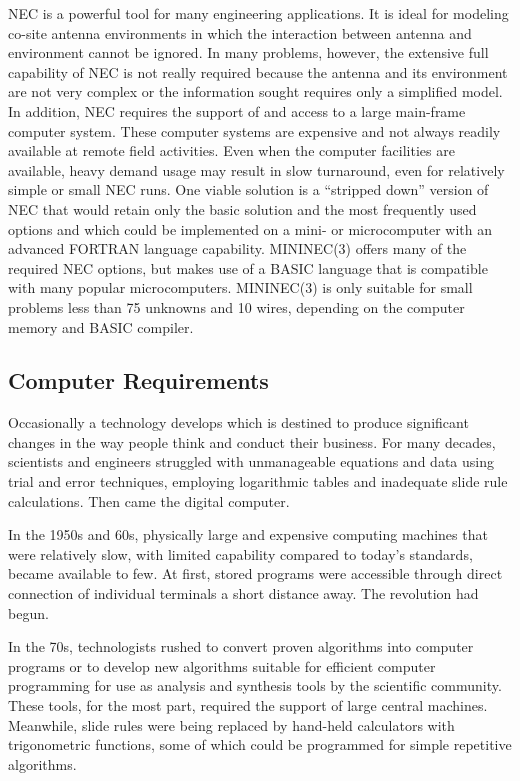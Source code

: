 \documentclass[12pt]{article}
\begin{document}
NEC is a powerful tool for many engineering applications. It is ideal
for modeling co-site antenna environments in which the interaction
between antenna and environment cannot be ignored. In many problems,
however, the extensive full capability of NEC is not really required
because the antenna and its environment are not very complex or the
information sought requires only a simplified model. In addition, NEC
requires the support of and access to a large main-frame computer
system. These computer systems are expensive and not always readily
available at remote field activities. Even when the computer facilities
are available, heavy demand usage may result in slow turnaround, even
for relatively simple or small NEC runs. One viable solution is a
``stripped down'' version of NEC that would retain only the basic
solution and the most frequently used options and which could be
implemented on a mini- or microcomputer with an advanced FORTRAN
language capability. MININEC(3) offers many of the required NEC options,
but makes use of a BASIC language that is compatible with many popular
microcomputers. MININEC(3) is only suitable for small problems less than
75 unknowns and 10 wires, depending on the computer memory and BASIC
compiler.

\subsection{Computer Requirements}
Occasionally a technology develops which is destined to produce
significant changes in the way people think and conduct their business.
For many decades, scientists and engineers struggled with unmanageable
equations and data using trial and error techniques, employing
logarithmic tables and inadequate slide rule calculations. Then came the
digital computer.

In the 1950s and 60s, physically large and expensive computing machines
that were relatively slow, with limited capability compared to today's
standards, became available to few. At first, stored programs were
accessible through direct connection of individual terminals a short
distance away. The revolution had begun.

In the 70s, technologists rushed to convert proven algorithms into
computer programs or to develop new algorithms suitable for efficient
computer programming for use as analysis and synthesis tools by the
scientific community. These tools, for the most part, required the
support of large central machines. Meanwhile, slide rules were being
replaced by hand-held calculators with trigonometric functions, some of
which could be programmed for simple repetitive algorithms.
\end{document}
